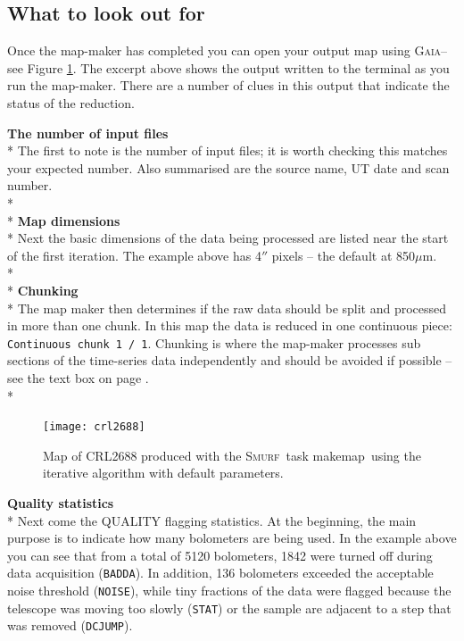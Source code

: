 \documentclass[twoside,11pt]{article}
\newcounter{box}
\newcommand{\xref}[3]{#1}
\newcommand{\xlabel}[1]{}
\renewcommand{\_}{\texttt{\symbol{95}}}
\newcommand{\gaia}{\xref{\textsc{Gaia}}{sun214}{}}
\newcommand{\smurf}{\xref{\textsc{Smurf}}{sun258}{}}
\newcommand{\task}[1]{\textsf{#1}}
\newcommand{\param}[1]{\texttt{#1}}
\newcommand{\makemap}{\xref{\task{makemap}}{sun258}{MAKEMAP}}
\begin{document}
\subsection{\xlabel{look_for}What to look out for}
\flushbottom
Once the map-maker has completed you can open your output map using \gaia -- see Figure \ref{fig:itermap}. The excerpt above shows the output written to the terminal as you run the map-maker. There are a number of clues in this output that indicate the status of the reduction.


\textbf{The number of input files}\\*
The first to note is the number of input files; it is worth checking this matches your expected number. Also summarised are the source name, UT date and scan number. 
\\*\\*
\textbf{Map dimensions}\\*
Next the basic dimensions of the data being processed are listed near the start of the first iteration. The example above has 4$''$ pixels -- the default at 850$\mu$m.
\\*\\*
\textbf{Chunking}\\*
The map maker then determines if the raw data should be split and processed in more than one chunk. In this map the data is reduced in one continuous piece: \param{Continuous chunk 1 / 1}. Chunking is where the map-maker processes sub sections of the time-series data independently and should be avoided if possible -- see the text box on page \pageref{page:text}.
\\*
\begin{figure}[t!]
\begin{center}
\texttt{[image: crl2688]}
\caption{Map of CRL2688 produced with the \smurf\ task \makemap\ using
  the iterative algorithm with default parameters.}
\label{fig:itermap}
\end{center}
\end{figure}

\textbf{Quality statistics}\\*
Next come the QUALITY flagging statistics. At the beginning, the main purpose is to indicate how many bolometers are being used. In the example above you can see that from a total of 5120 bolometers, 1842 were turned off during data acquisition (\texttt{BADDA}). In addition, 136 bolometers exceeded the acceptable noise threshold (\texttt{NOISE}), while tiny fractions of the data  were flagged because the telescope was moving too slowly (\texttt{STAT}) or the sample are adjacent to a step that was removed  (\texttt{DCJUMP}).
\end{document}
